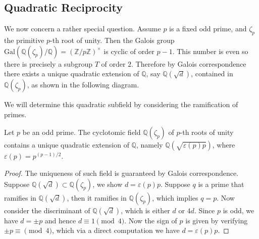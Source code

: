 \subsection{Quadratic Reciprocity}
We now concern a rather special question. Assume $p$ is a fixed odd prime, and $\zeta_p$ the primitive $p$-th root of unity. Then the Galois group $\mathrm{Gal}(\mathbb{Q}(\zeta_p)/\mathbb{Q})=(\mathbb{Z}/p\mathbb{Z})^\times$ is cyclic of order $p-1$. This number is even so there is precisely a subgroup $T$ of order $2$. Therefore by Galois correspondence there exists a unique quadratic extension of $\mathbb{Q}$, say $\mathbb{Q}(\sqrt{d})$, contained in $\mathbb{Q}(\zeta_p)$, as shown in the following diagram.
\begin{center}
\end{center}
We will determine this quadratic subfield by considering the ramification of primes.
\begin{theorem}
Let $p$ be an odd prime. The cyclotomic field $\mathbb{Q}(\zeta_p)$ of $p$-th roots of unity contains a unique quadratic extension of $\mathbb{Q}$, namely $\mathbb{Q}(\sqrt{\varepsilon(p)p})$, where $\varepsilon(p)=p^{(p-1)/2}$.
\end{theorem}
\begin{proof}
The uniqueness of such field is guaranteed by Galois correspondence. Suppose $\mathbb{Q}(\sqrt{d})\subset\mathbb{Q}(\zeta_p)$, we show $d=\varepsilon(p)p$. Suppose $q$ is a prime that ramifies in $\mathbb{Q}(\sqrt{d})$, then it ramifies in $\mathbb{Q}(\zeta_p)$, which implies $q=p$. Now consider the discriminant of $\mathbb{Q}(\sqrt{d})$, which is either $d$ or $4d$. Since $p$ is odd, we have $d=\pm p$ and hence $d\equiv 1\pmod{4}$. Now the sign of $p$ is given by verifying $\pm p\equiv\pmod{4}$, which via a direct computation we have $d=\varepsilon(p)p$.
\end{proof}
